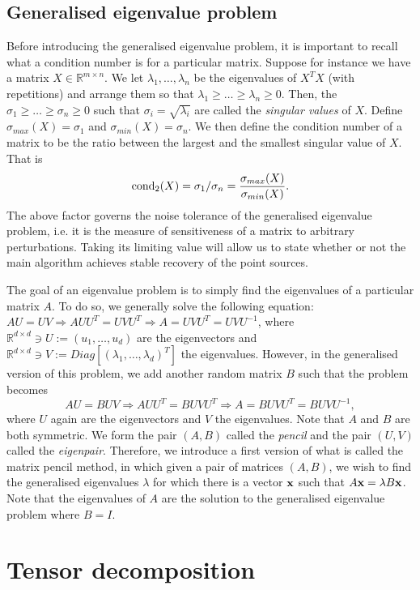 \subsection{Generalised eigenvalue problem}
Before introducing the generalised eigenvalue problem, it is important to recall what a condition number is for a particular matrix. Suppose for instance we have a matrix $X\in\mathbb{R}^{m\times n}$. We let $\lambda_1,\ldots,\lambda_n$ be the eigenvalues of $X^TX$ (with repetitions) and arrange them so that $\lambda_1\geq\ldots\geq\lambda_n\geq 0$. Then, the $\sigma_1\geq\ldots\geq\sigma_n\geq 0$ such that $\sigma_i=\sqrt{\lambda_i}$ are called the \textit{singular values} of $X$. Define $\sigma_{max}(X)=\sigma_1$ and $\sigma_{min}(X)=\sigma_n$. We then define the condition number of a matrix to be the ratio between the largest and the smallest singular value of $X$. That is 
\begin{equation}
    \operatorname*{cond_2}(X)=\sigma_1/\sigma_n=\frac{\sigma_{max}(X)}{\sigma_{min}(X)}.
\end{equation}
The above factor governs the noise tolerance of the generalised eigenvalue problem, i.e. it is the measure of sensitiveness of a matrix to arbitrary perturbations. Taking its limiting value will allow us to state whether or not the main algorithm achieves stable recovery of the point sources.\par
The goal of an eigenvalue problem is to simply find the eigenvalues of a particular matrix $A$. To do so, we generally solve the following equation: $AU=UV\Rightarrow AUU^T=UVU^T\Rightarrow A=UVU^T=UVU^{-1}$, where $\mathbb{R}^{d\times d}\ni U:=(u_1,\ldots,u_d)$ are the eigenvectors and $\mathbb{R}^{d\times d}\ni V:=Diag\left[(\lambda_1,\ldots,\lambda_d)^T\right]$ the eigenvalues. However, in the generalised version of this problem, we add another random matrix $B$ such that the problem becomes $$AU=BUV\Rightarrow AUU^T=BUVU^T\Rightarrow A=BUVU^T=BUVU^{-1},$$ where $U$ again are the eigenvectors and $V$ the eigenvalues. Note that $A$ and $B$ are both symmetric. We form the pair $(A,B)$ called the \textit{pencil} and the pair $(U,V)$ called the \textit{eigenpair}. Therefore, we introduce a first version of what is called the matrix pencil method, in which given a pair of matrices $(A,B)$, we wish to find the generalised eigenvalues $\lambda$ for which there is a vector ${\bf x}$ such that $A{\bf x}=\lambda B{\bf x}$. Note that the eigenvalues of $A$ are the solution to the generalised eigenvalue problem where $B=I$.

\section{Tensor decomposition}
